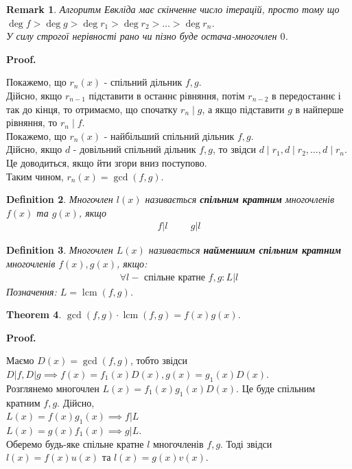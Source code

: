 \documentclass[a4paper, 10pt]{extarticle}
\makeatletter
\def\qed{$\blacksquare$}
\def\qed{$\blacksquare$}
\theoremstyle{theoremdd}
\newtheorem{theorem}{Theorem}[subsection]
\theoremstyle{theoremdd}
\newtheorem{definition}[theorem]{Definition}
\theoremstyle{theoremdd}
\theoremstyle{theoremdd}
\theoremstyle{theoremdd}
\theoremstyle{theoremdd}
\newtheorem{remark}[theorem]{Remark}
\theoremstyle{theoremdd}
\theoremstyle{theoremdd}
\renewenvironment{proof}[1][Proof.\\]{\par
\pushQED{\hfill \qed}%
\normalfont \topsep6\p@\@plus6\p@\relax
\trivlist
\item\relax
{\bfseries
#1\@addpunct{.}}\hspace\labelsep\ignorespaces
}{%
\popQED\endtrivlist\@endpefalse
}
\DeclareMathOperator{\lcm}{lcm}
\makeatother
\begin{document}
\begin{remark}
Алгоритм Евкліда має скінченне число ітерацій, просто тому що\\
$\deg f > \deg g > \deg r_1 > \deg r_2 > \dots > \deg r_n$.\\
У силу строгої нерівності рано чи пізно буде остача-многочлен $0$.
\end{remark}

\begin{proof}
Покажемо, що $r_n(x)$ - спільний дільник $f,g$.\\
Дійсно, якщо $r_{n-1}$ підставити в останнє рівняння, потім $r_{n-2}$ в передостаннє і так до кінця, то отримаємо, що спочатку $r_n \mid g$, а якщо підставити $g$ в найперше рівняння, то $r_n \mid f$.\\
Покажемо, що $r_n(x)$ - найбільший спільний дільник $f,g$.\\
Дійсно, якщо $d$ - довільний спільний дільник $f,g$, то звідси $d \mid r_1, d \mid r_2, \dots, d \mid r_n$. Це доводиться, якщо йти згори вниз поступово.\\
Таким чином, $r_n(x) = \gcd(f,g)$.
\end{proof}

\iffalse
\begin{definition}
Многочлен $l(x)$ називається \textbf{спільним кратним} многочленів $f(x)$ та $g(x)$, якщо
\begin{align*}
f | l \hspace{1cm} g | l
\end{align*}
\end{definition}

\begin{definition}
Многочлен $L(x)$ називається \textbf{найменшим спільним кратним} многочленів $f(x),g(x)$, якщо:
\begin{align*}
\forall l - \text{ спільне кратне } f,g: L | l
\end{align*}
Позначення: $L = \lcm(f,g)$.
\end{definition}

\begin{theorem}
$\gcd (f,g) \cdot \lcm (f,g) = f(x)g(x)$.
\end{theorem}

\begin{proof}
Маємо $D(x) = \gcd(f,g)$, тобто звідси $D | f, D | g \implies f(x) = f_1(x)D(x), g(x) = g_1(x)D(x)$.\\
Розглянемо многочлен $L(x) = f_1(x)g_1(x)D(x)$. Це буде спільним кратним $f,g$. Дійсно,\\
$L(x) = f(x)g_1(x) \implies f | L$\\
$L(x) = g(x)f_1(x) \implies g | L$.\\
Оберемо будь-яке спільне кратне $l$ многочленів $f,g$. Тоді звідси $l(x) = f(x) u(x)$ та $l(x) = g(x) v(x)$.\\
\end{proof}
\end{document}
